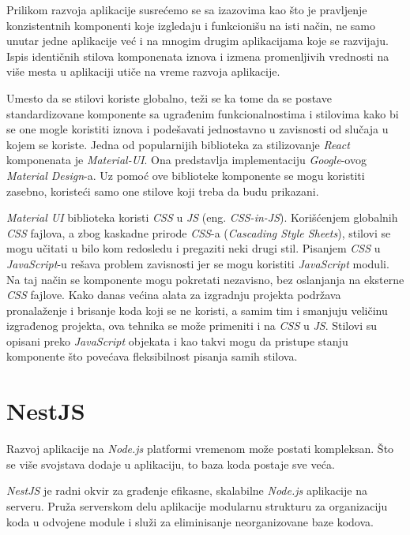 Prilikom razvoja aplikacije susrećemo se sa izazovima kao što je pravljenje konzistentnih komponenti koje izgledaju i funkcionišu 
na isti način, ne samo unutar jedne aplikacije već i na mnogim drugim aplikacijama koje se razvijaju. Ispis identičnih stilova 
komponenata iznova i izmena promenljivih vrednosti na više mesta u aplikaciji utiče na vreme razvoja aplikacije.

Umesto da se stilovi koriste globalno, teži se ka tome da se postave standardizovane komponente sa ugrađenim funkcionalnostima i 
stilovima kako bi se one mogle koristiti iznova i podešavati jednostavno u zavisnosti od slučaja u kojem se koriste.
Jedna od popularnijih biblioteka za stilizovanje \textit{React} komponenata je \textit{Material-UI}. Ona predstavlja 
implementaciju \textit{Google}-ovog \textit{Material Design}-a. Uz pomoć ove biblioteke komponente se mogu koristiti zasebno, 
koristeći samo one stilove koji treba da budu prikazani.

\textit{Material UI} biblioteka koristi \textit{CSS} u \textit{JS} (eng. \textit{CSS-in-JS}). Korišćenjem globalnih \textit{CSS} 
fajlova, a zbog kaskadne prirode \textit{CSS}-a (\textit{Cascading Style Sheets}), stilovi se mogu učitati u bilo kom redosledu 
i pregaziti neki drugi stil. Pisanjem \textit{CSS} u \textit{JavaScript}-u rešava problem zavisnosti jer se mogu koristiti 
\textit{JavaScript} moduli. Na taj način se komponente mogu pokretati nezavisno, bez oslanjanja na eksterne \textit{CSS} fajlove. 
Kako danas većina alata za izgradnju projekta podržava pronalaženje i brisanje koda koji se ne koristi, a samim tim i smanjuju 
veličinu izgrađenog projekta, ova tehnika se može primeniti i na \textit{CSS} u \textit{JS}. Stilovi su opisani preko 
\textit{JavaScript} objekata i kao takvi mogu da pristupe stanju komponente što povećava fleksibilnost pisanja samih stilova.


\section{NestJS}\label{sec:nestjs}
Razvoj aplikacije na \textit{Node.js} platformi vremenom može postati kompleksan. Što se više svojstava 
dodaje u aplikaciju, to baza koda postaje sve veća.

\textit{NestJS} je radni okvir za građenje efikasne, skalabilne \textit{Node.js} aplikacije na serveru. 
Pruža serverskom delu aplikacije modularnu strukturu za organizaciju koda u odvojene module i služi 
za eliminisanje neorganizovane baze kodova.

